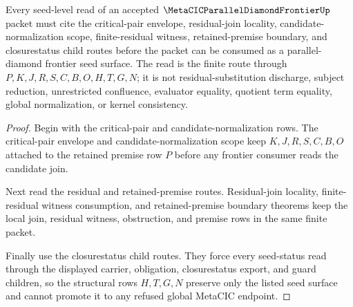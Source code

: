 \begin{theorem}
\label{thm:metacic-parallel-diamond-frontier-seed-closure-review}
Every seed-level read of an accepted $\MetaCICParallelDiamondFrontierUp$ packet must cite the critical-pair envelope, residual-join locality, candidate-normalization scope, finite-residual witness, retained-premise boundary, and closurestatus child routes before the packet can be consumed as a parallel-diamond frontier seed surface. The read is the finite route through $P,K,J,R,S,C,B,O,H,T,G,N$; it is not residual-substitution discharge, subject reduction, unrestricted confluence, evaluator equality, quotient term equality, global normalization, or kernel consistency.
\end{theorem}
\begin{proof}
Begin with the critical-pair and candidate-normalization rows. The critical-pair envelope and candidate-normalization scope keep $K,J,R,S,C,B,O$ attached to the retained premise row $P$ before any frontier consumer reads the candidate join.

Next read the residual and retained-premise routes. Residual-join locality, finite-residual witness consumption, and retained-premise boundary theorems keep the local join, residual witness, obstruction, and premise rows in the same finite packet.

Finally use the closurestatus child routes. They force every seed-status read through the displayed carrier, obligation, closurestatus export, and guard children, so the structural rows $H,T,G,N$ preserve only the listed seed surface and cannot promote it to any refused global MetaCIC endpoint.
\end{proof}
